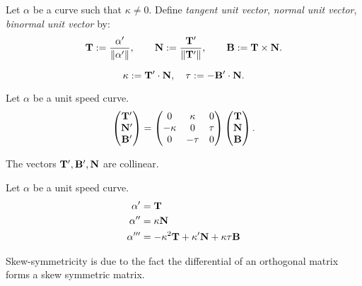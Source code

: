 \documentclass{../exp}
\def\a{\alpha}
\begin{document}
\begin{defn}
Let $\a$ be a curve such that $\kappa\ne0$.
Define \emph{tangent unit vector}, \emph{normal unit vector}, \emph{binormal unit vector} by:
\[\bT:=\frac{\a'}{\norm{\a'}},\qquad\bN:=\frac{\bT'}{\|\bT'\|},\qquad\bB:=\bT\x\bN.\]
\end{defn}
\begin{defn}
\[\kappa:=\mathbf{T}'\cdot\mathbf{N},\quad\tau:=-\mathbf{B}'\cdot\mathbf{N}.\]
\end{defn}

\begin{thm}
Let $\a$ be a unit speed curve.
\[\begin{pmatrix}\mathbf{T}'\\\mathbf{N}'\\\mathbf{B}'\end{pmatrix}=\begin{pmatrix}0&\kappa&0\\-\kappa&0&\tau\\0&-\tau&0\end{pmatrix}\begin{pmatrix}\mathbf{T}\\\mathbf{N}\\\mathbf{B}\end{pmatrix}.\]
\end{thm}
\begin{pf}
The vectors $\mathbf{T}',\mathbf{B}',\mathbf{N}$ are collinear.
\end{pf}


\begin{thm}
Let $\a$ be a unit speed curve.
\begin{align*}
\a'&=\bT\\
\a''&=\kappa\bN\\
\a'''&=-\kappa^2\bT+\kappa'\bN+\kappa\tau\bB
\end{align*}
\end{thm}

Skew-symmetricity is due to the fact the differential of an orthogonal matrix forms a skew symmetric matrix.
\end{document}
